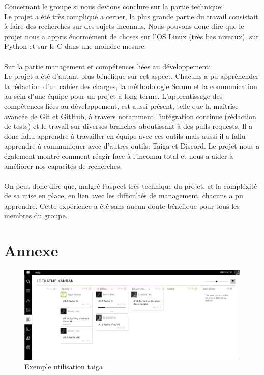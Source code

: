 \documentclass[french]{report}
\begin{document}
Concernant le groupe si nous devions conclure sur la partie technique:\\
Le projet a été très compliqué a cerner, la plus grande partie du travail consistait
à faire des recherches sur des sujets inconnus. Nous pouvons donc dire que le projet
nous a appris énormément de choses sur l'OS Linux (très bas niveaux), sur Python et sur le C
dans une moindre mesure.
\\\\
Sur la partie management et compétences liées au développement:\\
Le projet a été d'autant plus bénéfique sur cet aspect. Chacuns a pu appréhender
la rédaction d'un cahier des charges, la méthodologie Scrum et la communication
au sein d'une équipe pour un projet à long terme. L'apprentissage des compétences liées
au développement, est aussi présent, telle que la maîtrise avancée de Git et GitHub, à travers notamment
l'intégration continue (rédaction de tests) et le travail sur diverses branches aboutissant à des pulls
requests. Il a donc fallu apprendre à travailler en équipe avec ces outils mais aussi
il a fallu apprendre à communiquer avec d'autres outils: Taiga et Discord.
Le projet nous a également montré comment réagir face à l'inconnu total et nous
a aider à améliorer nos capacités de recherches.
\\\\
On peut donc dire que, malgré l'aspect très technique du projet, et la compléxité
de sa mise en place, en lien avec les difficultés de management, chacuns a pu apprendre.
Cette expérience a été sans aucun doute bénéfique pour tous les membres du groupe.




\chapter*{Annexe}

\begin{figure}[h]\label{fig:Taiga}
  \includegraphics[width=\linewidth]{taiga2}
  \caption{Exemple utilisation taiga}
  \label{fig:Taiga}
\end{figure}
\end{document}
